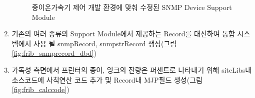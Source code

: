 \documentclass[11pt
  , a4paper
  , article
  , oneside
]{memoir}
\begin{document}
\begin{enumerate}
\begin{figure}[!h]
            \hfill
{}
            \hfill
{}
 	                \hfill
{}
	                \hfill
  \caption
      {
        중이온가속기 제어 개발 환경에 맞춰 수정된 SNMP Device Support Module 
      }
 \label{fig:frib_raon}
\end{figure}

\clearpage
\item 기존의 여러 종류의 Support Module에서 제공하는 Record를 대신하여 통합 시스템에서 사용 될 snmpRecord, snmpstrRecord 생성(그림 \ref{fig:frib_snmprecord_dbd})
\item 가독성 측면에서 프린터의 종이, 잉크의 잔량은 퍼센트로 나타내기 위해 siteLibs내 소스코드에 사칙연산 코드 추가 및 Record내 MJP필드 생성(그림 \ref{fig:frib_calccode})
\end{enumerate}
\end{document}
